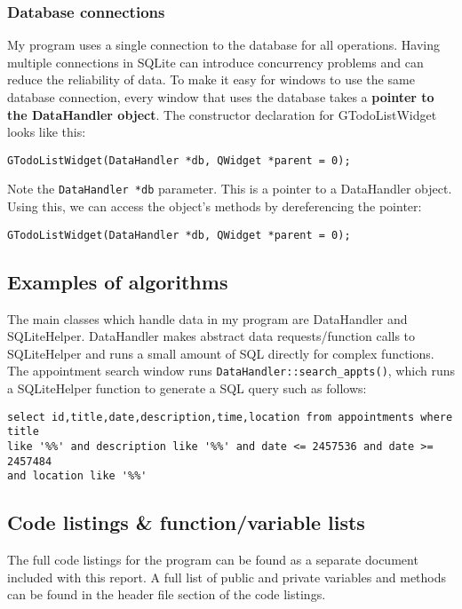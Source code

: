 \subsubsection{Database connections}

My program uses a single connection to the database for all operations. Having
multiple connections in SQLite can introduce concurrency problems and can
reduce the reliability of data. To make it easy for windows to use the same
database connection, every window that uses the database takes a \textbf{pointer
to the DataHandler object}. The constructor declaration for GTodoListWidget
looks like this:

\begin{verbatim}
GTodoListWidget(DataHandler *db, QWidget *parent = 0);
\end{verbatim}

Note the \texttt{DataHandler *db} parameter. This is a pointer to a DataHandler
object. Using this, we can access the object's methods by dereferencing the
pointer:

\begin{verbatim}
GTodoListWidget(DataHandler *db, QWidget *parent = 0);
\end{verbatim}


\subsection{Examples of algorithms}

The main classes which handle data in my program are DataHandler and
SQLiteHelper. DataHandler makes abstract data requests/function calls to
SQLiteHelper and runs a small amount of SQL directly for complex functions. The
appointment search window runs \verb|DataHandler::search_appts()|, which runs a
SQLiteHelper function to generate a SQL query such as follows:

\begin{verbatim}
select id,title,date,description,time,location from appointments where title
like '%%' and description like '%%' and date <= 2457536 and date >= 2457484
and location like '%%'
\end{verbatim}


\subsection{Code listings \& function/variable lists}

The full code listings for the program can be found as a separate document
included with this report. A full list of public and private variables and
methods can be found in the header file section of the code listings.
